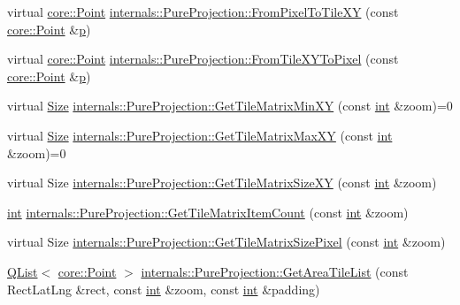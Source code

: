 \begin{DoxyCompactItemize}
\item 
virtual \hyperlink{structcore_1_1_point}{core\-::\-Point} \hyperlink{group___o_p_map_widget_ga44846fe14a2b915a79c730b0b6513579}{internals\-::\-Pure\-Projection\-::\-From\-Pixel\-To\-Tile\-X\-Y} (const \hyperlink{structcore_1_1_point}{core\-::\-Point} \&\hyperlink{glext_8h_aa5367c14d90f462230c2611b81b41d23}{p})
\item 
virtual \hyperlink{structcore_1_1_point}{core\-::\-Point} \hyperlink{group___o_p_map_widget_ga6eb6b9db59d0e4e58f4e70c4d4d2887a}{internals\-::\-Pure\-Projection\-::\-From\-Tile\-X\-Y\-To\-Pixel} (const \hyperlink{structcore_1_1_point}{core\-::\-Point} \&\hyperlink{glext_8h_aa5367c14d90f462230c2611b81b41d23}{p})
\item 
virtual \hyperlink{structcore_1_1_size}{Size} \hyperlink{group___o_p_map_widget_ga655cbf971f1a5d2df37f97d6e7b422f5}{internals\-::\-Pure\-Projection\-::\-Get\-Tile\-Matrix\-Min\-X\-Y} (const \hyperlink{ioapi_8h_a787fa3cf048117ba7123753c1e74fcd6}{int} \&zoom)=0
\item 
virtual \hyperlink{structcore_1_1_size}{Size} \hyperlink{group___o_p_map_widget_ga5588735ea108bf7743f87c86fe14f3f1}{internals\-::\-Pure\-Projection\-::\-Get\-Tile\-Matrix\-Max\-X\-Y} (const \hyperlink{ioapi_8h_a787fa3cf048117ba7123753c1e74fcd6}{int} \&zoom)=0
\item 
virtual Size \hyperlink{group___o_p_map_widget_ga4ae08027e37b2017b358d8fbe75ae5c6}{internals\-::\-Pure\-Projection\-::\-Get\-Tile\-Matrix\-Size\-X\-Y} (const \hyperlink{ioapi_8h_a787fa3cf048117ba7123753c1e74fcd6}{int} \&zoom)
\item 
\hyperlink{ioapi_8h_a787fa3cf048117ba7123753c1e74fcd6}{int} \hyperlink{group___o_p_map_widget_ga9729f2fced303b2b353fbb8349a16a18}{internals\-::\-Pure\-Projection\-::\-Get\-Tile\-Matrix\-Item\-Count} (const \hyperlink{ioapi_8h_a787fa3cf048117ba7123753c1e74fcd6}{int} \&zoom)
\item 
virtual Size \hyperlink{group___o_p_map_widget_ga2756c4a5e52399306da81bb913106474}{internals\-::\-Pure\-Projection\-::\-Get\-Tile\-Matrix\-Size\-Pixel} (const \hyperlink{ioapi_8h_a787fa3cf048117ba7123753c1e74fcd6}{int} \&zoom)
\item 
\hyperlink{class_q_list}{Q\-List}$<$ \hyperlink{structcore_1_1_point}{core\-::\-Point} $>$ \hyperlink{group___o_p_map_widget_gab8c7480cc18ebba515ca1c9c4258a2fd}{internals\-::\-Pure\-Projection\-::\-Get\-Area\-Tile\-List} (const Rect\-Lat\-Lng \&rect, const \hyperlink{ioapi_8h_a787fa3cf048117ba7123753c1e74fcd6}{int} \&zoom, const \hyperlink{ioapi_8h_a787fa3cf048117ba7123753c1e74fcd6}{int} \&padding)

\end{DoxyCompactItemize}
